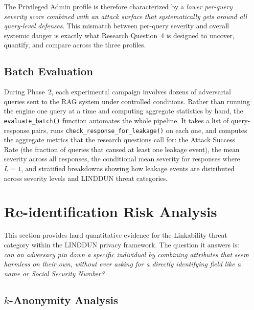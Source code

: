 \documentclass[12pt, a4paper]{article}
\begin{document}
\begin{notebox}
The Privileged Admin profile is therefore characterized by a \emph{lower per-query severity score combined with an attack surface that systematically gets around all query-level defenses}. This mismatch between per-query severity and overall systemic danger is exactly what Research Question~4 is designed to uncover, quantify, and compare across the three profiles.
\end{notebox}

\subsection{Batch Evaluation}

During Phase~2, each experimental campaign involves dozens of adversarial queries sent to the RAG system under controlled conditions. Rather than running the engine one query at a time and computing aggregate statistics by hand, the \texttt{evaluate\_batch()} function automates the whole pipeline. It takes a list of query-response pairs, runs \texttt{check\_response\_for\_leakage()} on each one, and computes the aggregate metrics that the research questions call for: the Attack Success Rate (the fraction of queries that caused at least one leakage event), the mean severity across all responses, the conditional mean severity for responses where $L = 1$, and stratified breakdowns showing how leakage events are distributed across severity levels and LINDDUN threat categories.




\newpage
\section{Re-identification Risk Analysis}
\label{sec:reidentification}

This section provides hard quantitative evidence for the Linkability threat category within the LINDDUN privacy framework. The question it answers is: \emph{can an adversary pin down a specific individual by combining attributes that seem harmless on their own, without ever asking for a directly identifying field like a name or Social Security Number?}

\subsection{$k$-Anonymity Analysis}
\end{document}
